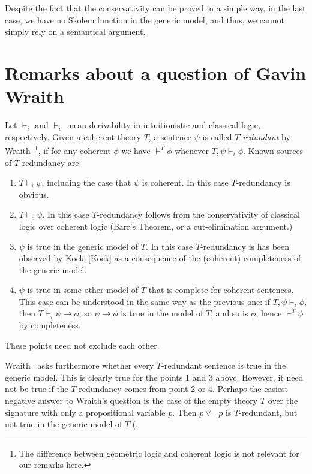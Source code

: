 \documentclass[10pt,a4paper]{article}
\begin{document}
\medskip

 Despite the fact that the conservativity can be proved in a simple way, in the last case, we
have no Skolem function in the generic model, and thus, we cannot simply rely on a semantical
argument.

\section{Remarks about a question of Gavin Wraith}

Let $\vdash_i$ and $\vdash_c$ mean derivability in intuitionistic and classical logic,
respectively. Given a coherent theory $T$, 
a sentence $\psi$ is called $T$-\emph{redundant} by
Wraith~\cite[p. 336]{Wraith}\footnote{The difference
between geometric logic and coherent logic is not relevant for our remarks here.},
if for any coherent $\phi$ we have
$\vdash^T \phi$ whenever $T,\psi \vdash_i \phi$.
Known sources of $T$-redundancy are:
\begin{enumerate}
\item $T \vdash_i \psi$, including the case that $\psi$ is coherent.
In this case $T$-redundancy is obvious.
\item $T \vdash_c \psi$. In this case $T$-redundancy follows from the conservativity
of classical logic over coherent logic (Barr's Theorem, or a cut-elimination argument.)
\item $\psi$ is true in the generic model of $T$. In this case $T$-redundancy is
has been observed by Kock~\ref{Kock} as a consequence of the (coherent) completeness
of the generic model.
\item $\psi$ is true in some other model of $T$ that is complete for coherent 
sentences. This case can be understood in the same way as the previous one: 
if $T,\psi \vdash_i \phi$, then $T \vdash_i \psi\to\phi$, so $\psi\to\phi$ is true in
the model of $T$, and so is $\phi$, hence $\vdash^{T} \phi$ by completeness.
\end{enumerate}
These points need not exclude each other.

Wraith~\cite[p. 336]{Wraith} asks furthermore whether every $T$-redundant
sentence is true in the generic model. This is clearly true for the points 1 and 3 above.
However, it need not be true if the $T$-redundancy comes from point 2 or 4.
Perhaps the easiest negative answer to Wraith's question is the case of
the empty theory $T$ over the signature with only a propositional variable $p$.
Then $p\lor\neg p$ is $T$-redundant, but not true in the generic model of $T$
(.
\end{document}
